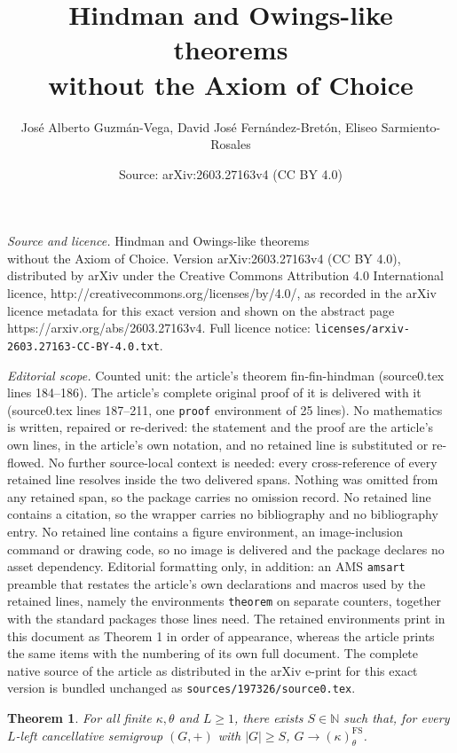 \documentclass[10pt,a4paper]{amsart}
\title{Hindman and Owings-like theorems \\ without the Axiom of Choice}
\author{José Alberto Guzmán-Vega, David José Fernández-Bretón, Eliseo Sarmiento-Rosales}
\date{Source: arXiv:2603.27163v4 (CC BY 4.0)}
\newtheorem{theorem}{Theorem}
\begin{document}
\maketitle

\noindent\emph{Source and licence.} Hindman and Owings-like theorems \\ without the Axiom of Choice. Version arXiv:2603.27163v4 (CC BY 4.0), distributed by arXiv under the Creative Commons Attribution 4.0 International licence, http://creativecommons.org/licenses/by/4.0/, as recorded in the arXiv licence metadata for this exact version and shown on the abstract page https://arxiv.org/abs/2603.27163v4. Full licence notice: \texttt{licenses/arxiv-2603.27163-CC-BY-4.0.txt}.\par\smallskip

\noindent\textit{Editorial scope.} Counted unit: the article's theorem fin-fin-hindman (source0.tex lines 184--186). The article's complete original proof of it is delivered with it (source0.tex lines 187--211, one \texttt{proof} environment of 25 lines). No mathematics is written, repaired or re-derived: the statement and the proof are the article's own lines, in the article's own notation, and no retained line is substituted or re-flowed.  No further source-local context is needed: every cross-reference of every retained line resolves inside the two delivered spans.  Nothing was omitted from any retained span, so the package carries no omission record.  No retained line contains a citation, so the wrapper carries no bibliography and no bibliography entry.  No retained line contains a figure environment, an image-inclusion command or drawing code, so no image is delivered and the package declares no asset dependency.  Editorial formatting only, in addition: an AMS \texttt{amsart} preamble that restates the article's own declarations and macros used by the retained lines, namely the environments \texttt{theorem} on separate counters, together with the standard packages those lines need.  The retained environments print in this document as Theorem 1 in order of appearance, whereas the article prints the same items with the numbering of its own full document.  The complete native source of the article as distributed in the arXiv e-print for this exact version is bundled unchanged as \texttt{sources/197326/source0.tex}.
\begin{theorem}\label{fin-fin-hindman}
    For all finite $\kappa,\theta$ and $L\geq 1$, there exists $S\in\mathbb{N}$ such that, for every $L$-left cancellative semigroup $(G,+)$ with $|G|\geq S$, $G\to (\kappa)_{\theta}^{\operatorname{FS}}$.
\end{theorem}
\end{document}

